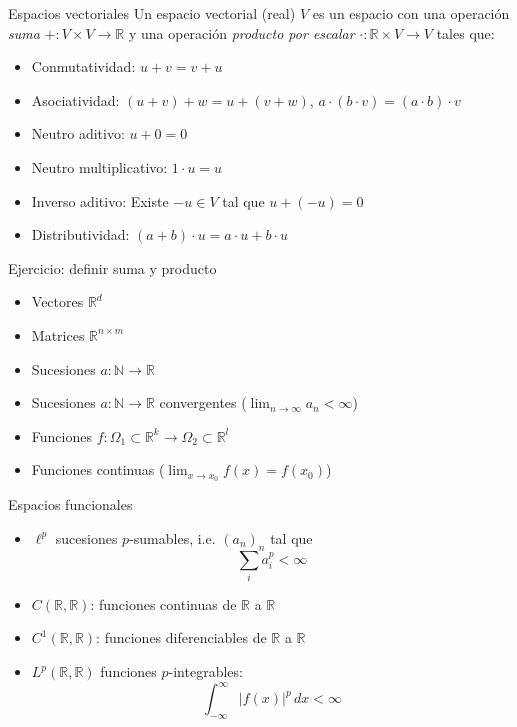 \documentclass[12pt,aspectratio=169,xcolor=dvipsnames]{beamer}
\newcommand{\R}{\mathbb{R}}
\begin{document}
\begin{frame}[t]{Espacios vectoriales}
    Un espacio vectorial (real) $V$ es un espacio con una operación \emph{suma} $+:V\times V \to \R$ y una operación \emph{producto por escalar} $\cdot: \R\times V \to V$ tales que:
    \begin{itemize}
        \item Conmutatividad: $u+v=v+u$
        \item Asociatividad: $(u+v)+w =u+(v+w)$, $a\cdot(b\cdot v)=(a\cdot b)\cdot v$
        \item Neutro aditivo: $u + 0 = 0$
        \item Neutro multiplicativo: $1\cdot u = u$
        \item Inverso aditivo: Existe $-u\in V$ tal que $u + (-u) = 0$
        \item Distributividad: $(a+b)\cdot u = a\cdot u + b\cdot u$
    \end{itemize}
    
    \vspace{0.5cm}
\end{frame}
\begin{frame}{Ejercicio: definir suma y producto}
    \begin{itemize}
        \item Vectores $\R^d$
        \item Matrices $\R^{n\times m}$
        \item Sucesiones $a:\mathbb N\to \R$
        \item Sucesiones $a:\mathbb N \to \R$ convergentes ($\lim_{n\to\infty} a_n < \infty$)
        \item Funciones $f:\Omega_1 \subset \R^k \to \Omega_2\subset \R^l$
        \item Funciones continuas ($\lim_{x\to x_0} f(x) = f(x_0)$)
    \end{itemize}

    \vspace{1cm}
\end{frame}
\begin{frame}{Espacios funcionales}
    \begin{itemize}
        \item $\ell^p$ sucesiones $p$-sumables, i.e. $(a_n)_n$ tal que
                $$ \sum_i a_i^p < \infty $$
        \item $C(\R,\R)$: funciones continuas de $\R$ a $\R$
        \item $C^1(\R, \R)$: funciones diferenciables de $\R$ a $\R$
        \item $L^p(\R,\R)$ funciones $p$-integrables:
                $$\int_{-\infty}^\infty |f(x)|^p\,dx < \infty $$
    \end{itemize}
\end{frame}
\end{document}
